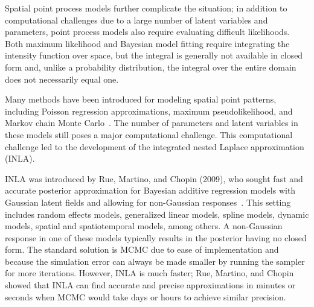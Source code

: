 \documentclass[]{interact}
\begin{document}
Spatial point process models further complicate the situation; in addition to
computational challenges due to a large number of latent variables and
parameters, point process models also require evaluating difficult
likelihoods. Both maximum likelihood and Bayesian model fitting require
integrating the intensity function over space, but the integral is generally
not available in closed form and, unlike a probability distribution, the
integral over the entire domain does not necessarily equal one.

Many methods have been introduced for modeling spatial point patterns,
including Poisson regression approximations, maximum pseudolikelihood, and
Markov chain Monte
Carlo~\cite{bermanturner,baddeleyetal,baddeleyturner,moellerwaagepetersen}.
The number of parameters and latent variables in these models still poses a
major computational challenge. This computational challenge led to the
development of the integrated nested Laplace approximation (INLA).

INLA was introduced by Rue, Martino, and Chopin (2009), who sought fast and
accurate posterior approximation for Bayesian additive regression models with
Gaussian latent fields and allowing for non-Gaussian responses~\cite{rueetal}.
This setting includes random effects models, generalized linear models, spline
models, dynamic models, spatial and spatiotemporal models, among others.
A non-Gaussian response in one of these models typically results in the
posterior having no closed form. The standard solution is MCMC due to ease of
implementation and because the simulation error can always be made smaller by
running the sampler for more iterations. However, INLA is much faster; Rue,
Martino, and Chopin showed that INLA can find accurate and precise
approximations in minutes or seconds when MCMC would take days or hours to
achieve similar precision.

\end{document}
